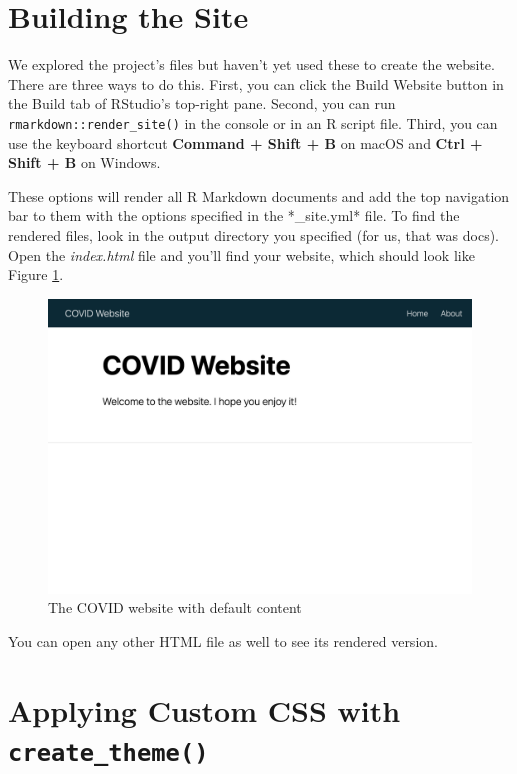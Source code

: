 \documentclass[
]{book}
\begin{document}
\hypertarget{building-the-site}{%
\section*{Building the Site}\label{building-the-site}}

We explored the project's files but haven't yet used these to create the website. There are three ways to do this. First, you can click the Build Website button in the Build tab of RStudio's top-right pane. Second, you can run \texttt{rmarkdown::render\_site()} in the console or in an R script file. Third, you can use the keyboard shortcut \textbf{Command + Shift + B} on macOS and \textbf{Ctrl + Shift + B} on Windows.

These options will render all R Markdown documents and add the top navigation bar to them with the options specified in the *\_site.yml* file. To find the rendered files, look in the output directory you specified (for us, that was docs). Open the \emph{index.html} file and you'll find your website, which should look like Figure \ref{fig:covid-website-default-content}.

\begin{figure}
\includegraphics[width=1\linewidth]{assets/covid-website-default-content} \caption{The COVID website with default content}\label{fig:covid-website-default-content}
\end{figure}

You can open any other HTML file as well to see its rendered version.

\hypertarget{applying-custom-css-with-create_theme}{%
\section*{\texorpdfstring{Applying Custom CSS with \texttt{create\_theme()}}{Applying Custom CSS with create\_theme()}}\label{applying-custom-css-with-create_theme}}
\end{document}
